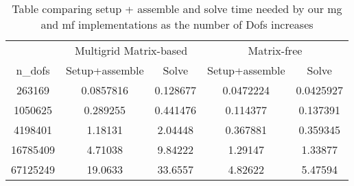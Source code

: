 \begin{table}[h]
    \centering
    \begin{tabular}{|c|c|c|c|c|}
        \hline
        & \multicolumn{2}{c|}{Multigrid Matrix-based} & \multicolumn{2}{c|}{Matrix-free} \\
        \cline{2-5}
        n\_dofs & Setup+assemble & Solve & Setup+assemble & Solve \\
        \hline
        263169 & 0.0857816 & 0.128677 & 0.0472224 & 0.0425927 \\
        1050625 & 0.289255 & 0.441476 & 0.114377 & 0.137391 \\
        4198401 & 1.18131 & 2.04448 & 0.367881 & 0.359345 \\
        16785409 & 4.71038 & 9.84222 & 1.29147 & 1.33877 \\
        67125249 & 19.0633 & 33.6557 & 4.82622 & 5.47594 \\
        \hline
    \end{tabular}
    \caption{Table comparing setup + assemble and solve time needed by our mg and mf implementations as the number of Dofs increases}
    \label{tab:dim_time}
\end{table}
